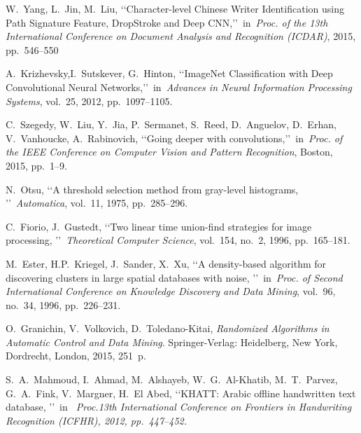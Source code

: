 \documentclass[conference]{IEEEtran}
\begin{document}
\begin{thebibliography}{1}
 W.~Yang, L.~Jin, M.~Liu, \lq\lq Character-level Chinese Writer Identification using Path Signature Feature, DropStroke and Deep CNN,\rq\rq~in~\emph{Proc. of the 13th International Conference on Document Analysis and Recognition (ICDAR)}, 2015, pp.~546--550

 A.~Krizhevsky,I.~Sutskever, G.~Hinton, \lq\lq ImageNet Classification with Deep Convolutional Neural Networks,\rq\rq~in~\emph{Advances in Neural Information Processing Systems}, vol.~25, 2012, pp.~1097--1105.

 C.~Szegedy, W.~Liu, Y.~Jia, P.~Sermanet, S.~Reed, D.~Anguelov, D.~Erhan, V.~Vanhoucke, A.~Rabinovich, \lq\lq Going deeper with convolutions,\rq\rq~in~\emph{Proc. of the IEEE Conference on Computer Vision and Pattern Recognition}, Boston, 2015, pp.~1--9.

 N.~Otsu, \lq\lq A threshold selection method from gray-level histograms, \rq\rq~\emph{Automatica}, vol.~11, 1975, pp.~285--296.

 C.~Fiorio, J.~Gustedt, \lq\lq Two linear time union-find strategies for image processing, \rq\rq~\emph{Theoretical Computer Science}, vol.~154, no.~2, 1996, pp.~165--181.

 M.~Ester, H.P.~Kriegel, J.~Sander, X.~Xu, \lq\lq A density-based algorithm for discovering clusters in large spatial databases with noise, \rq\rq~in~\emph{Proc. of Second International
Conference on Knowledge Discovery and Data Mining}, vol.~96, no.~34, 1996, pp.~226--231.

 O.~Granichin, V.~Volkovich, D.~Toledano-Kitai, \emph{Randomized Algorithms in Automatic Control and Data Mining}. Springer-Verlag: Heidelberg, New York, Dordrecht, London, 2015, 251~p.

 S.~A.~Mahmoud, I.~Ahmad, M.~Alshayeb, W.~G.~Al-Khatib, M.~T.~Parvez, G.~A.~Fink, V.~Margner, H.~El Abed, \lq\lq KHATT: Arabic offline handwritten text database, \rq\rq~in~\em{ Proc.13th International Conference on Frontiers in Handwriting Recognition (ICFHR)}, 2012, pp.~447--452.

\end{thebibliography}
\end{document}
